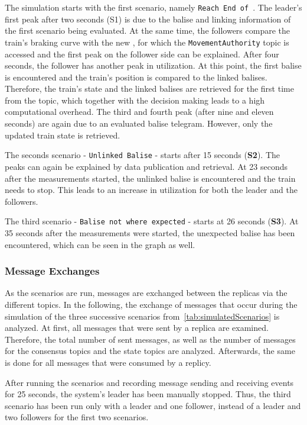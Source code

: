 The simulation starts with the first scenario, namely \texttt{Reach End of }.
The leader's first peak after two seconds (S1) is due to the balise and linking information of the first scenario being evaluated.
At the same time, the followers compare the train's braking curve with the new , for which the \texttt{MovementAuthority} topic is accessed and the first peak on the follower side can be explained.
After four seconds, the follower has another peak in  utilization.
At this point, the first balise is encountered and the train's position is compared to the linked balises.
Therefore, the train's state and the linked balises are retrieved for the first time from the topic, which together with the decision making leads to a high computational overhead.
The third and fourth peak (after nine and eleven seconds) are again due to an evaluated balise telegram.
However, only the updated train state is retrieved.

The seconds scenario - \texttt{Unlinked Balise} - starts after 15 seconds (\textbf{S2}).
The peaks can again be explained by data publication and retrieval.
At 23 seconds after the measurements started, the unlinked balise is encountered and the train needs to stop.
This leads to an increase in  utilization for both the leader and the followers.

The third scenario - \texttt{Balise not where expected} - starts at 26 seconds (\textbf{S3}).
At 35 seconds after the measurements were started, the unexpected balise has been encountered, which can be seen in the graph as well.

\subsubsection{Message Exchanges}
As the scenarios are run, messages are exchanged between the replicas via the different  topics.
In the following, the exchange of messages that occur during the simulation of the three successive scenarios from~\autoref{tab:simulatedScenarios} is analyzed.
At first, all messages that were sent by a replica are examined.
Therefore, the total number of sent messages, as well as the number of messages for the consensus topics and the state topics are analyzed.
Afterwards, the same is done for all messages that were consumed by a replicy.

After running the scenarios and recording message sending and receiving events for 25 seconds, the system's leader has been manually stopped.
Thus, the third scenario has been run only with a leader and one follower, instead of a leader and two followers for the first two scenarios.
\\

